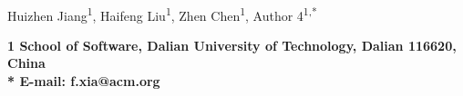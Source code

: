 \documentclass[10pt,letterpaper]{article}
\date{}
\begin{document}
\vspace*{0.35in}

\begin{flushleft}
{\Large
\textbf{}
}
\newline
\\
Huizhen Jiang\textsuperscript{1},
Haifeng Liu\textsuperscript{1},
Zhen Chen\textsuperscript{1},
Author 4\textsuperscript{1,*}


\bf{1} School of Software, Dalian University of Technology, Dalian 116620, China
\\

%
%





* E-mail: f.xia@acm.org
\end{flushleft}

\end{document}
